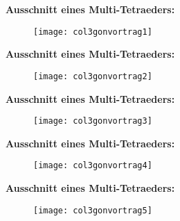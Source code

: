 \documentclass{beamer}
\begin{document}
\begin{frame}
\textbf{Ausschnitt eines Multi-Tetraeders:}
\begin{figure}[H]
\begin{center}
\texttt{[image: col3gonvortrag1]}
\end{center}
\end{figure}
\end{frame}
\begin{frame}
\textbf{Ausschnitt eines Multi-Tetraeders:}
\begin{figure}[H]
\begin{center}
\texttt{[image: col3gonvortrag2]}
\end{center}
\end{figure}
\end{frame}
\begin{frame}
\textbf{Ausschnitt eines Multi-Tetraeders:}
\begin{figure}[H]
\begin{center}
\texttt{[image: col3gonvortrag3]}
\end{center}
\end{figure}
\end{frame}
\begin{frame}
\textbf{Ausschnitt eines Multi-Tetraeders:}
\begin{figure}[H]
\begin{center}
\texttt{[image: col3gonvortrag4]}
\end{center}
\end{figure}
\end{frame}
\begin{frame}
\textbf{Ausschnitt eines Multi-Tetraeders:}
\begin{figure}[H]
\begin{center}
\texttt{[image: col3gonvortrag5]}
\end{center}
\end{figure}
\end{frame}
\end{document}
